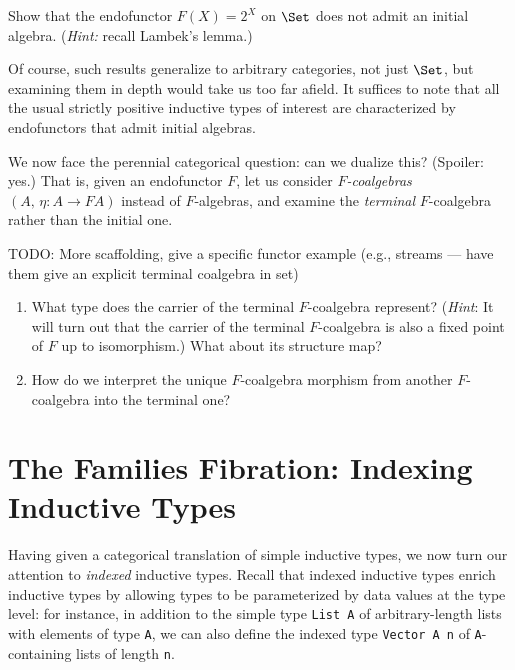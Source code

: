 \begin{exercise}
Show that the endofunctor $F(X) = 2^X$ on $\Set$ does not admit an initial algebra.
(\emph{Hint:} recall Lambek's lemma.)
\end{exercise}

Of course, such results generalize to arbitrary categories, not just $\Set$, but examining
them in depth would take us too far afield. It suffices to note that all the usual strictly positive
inductive types of interest are characterized by endofunctors that admit initial algebras.

\begin{exercise}
\sloppy
  We now face the perennial categorical question: can we dualize this? (Spoiler: yes.) That is,
  given an endofunctor $F$, let us consider \emph{$F$-coalgebras} $(A,\, \eta : A \to F A)$ instead
  of $F$-algebras, and examine the \emph{terminal} $F$-coalgebra rather than the initial one.
  
  TODO: More scaffolding, give a specific functor example (e.g., streams --- have them give an
  explicit terminal coalgebra in set)

  \begin{enumerate}
    \item What type does the carrier of the terminal $F$-coalgebra represent? (\emph{Hint}: It will
          turn out that the carrier of the terminal $F$-coalgebra is also a fixed point of $F$ up to
          isomorphism.) What about its structure map?

    \item How do we interpret the unique $F$-coalgebra morphism from another $F$-coalgebra into the
          terminal one?
  \end{enumerate}
\end{exercise}

\section{The Families Fibration: Indexing Inductive Types}

Having given a categorical translation of simple inductive types, we now turn our attention to
\emph{indexed} inductive types. Recall that indexed inductive types enrich inductive types by
allowing types to be parameterized by data values at the type level: for instance, in addition to
the simple type \texttt{List A} of arbitrary-length lists with elements of type \texttt{A}, we can
also define the indexed type \texttt{Vector A n} of \texttt{A}-containing lists of length
\texttt{n}.

